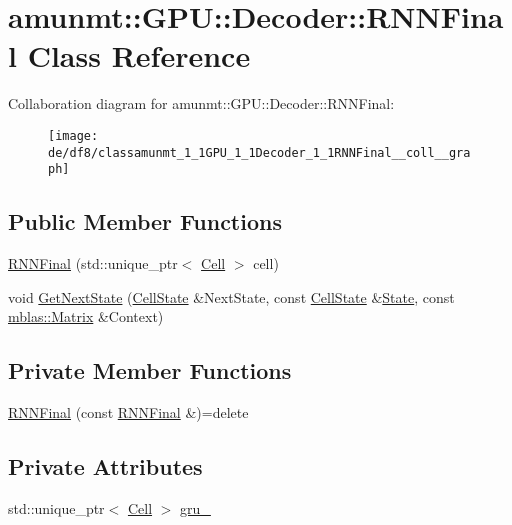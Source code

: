 \hypertarget{classamunmt_1_1GPU_1_1Decoder_1_1RNNFinal}{}\section{amunmt\+:\+:G\+PU\+:\+:Decoder\+:\+:R\+N\+N\+Final Class Reference}
\label{classamunmt_1_1GPU_1_1Decoder_1_1RNNFinal}


Collaboration diagram for amunmt\+:\+:G\+PU\+:\+:Decoder\+:\+:R\+N\+N\+Final\+:
\nopagebreak
\begin{figure}[H]
\begin{center}
\leavevmode
\texttt{[image: de/df8/classamunmt\_1\_1GPU\_1\_1Decoder\_1\_1RNNFinal\_\_coll\_\_graph]}
\end{center}
\end{figure}
\subsection*{Public Member Functions}
\begin{DoxyCompactItemize}
\item 
\hyperlink{classamunmt_1_1GPU_1_1Decoder_1_1RNNFinal_a1d99985b912cc2eee9d837d2bac30799}{R\+N\+N\+Final} (std\+::unique\+\_\+ptr$<$ \hyperlink{classamunmt_1_1GPU_1_1Cell}{Cell} $>$ cell)
\item 
void \hyperlink{classamunmt_1_1GPU_1_1Decoder_1_1RNNFinal_a1b0db5fb40335eeb2acdd098220cbb32}{Get\+Next\+State} (\hyperlink{structamunmt_1_1GPU_1_1CellState}{Cell\+State} \&Next\+State, const \hyperlink{structamunmt_1_1GPU_1_1CellState}{Cell\+State} \&\hyperlink{classamunmt_1_1State}{State}, const \hyperlink{namespaceamunmt_1_1GPU_1_1mblas_ab67821a8254de53e45a623cf73c0aef6}{mblas\+::\+Matrix} \&Context)
\end{DoxyCompactItemize}
\subsection*{Private Member Functions}
\begin{DoxyCompactItemize}
\item 
\hyperlink{classamunmt_1_1GPU_1_1Decoder_1_1RNNFinal_ae7163a490feab5420d5e0f3e64e50d49}{R\+N\+N\+Final} (const \hyperlink{classamunmt_1_1GPU_1_1Decoder_1_1RNNFinal}{R\+N\+N\+Final} \&)=delete
\end{DoxyCompactItemize}
\subsection*{Private Attributes}
\begin{DoxyCompactItemize}
\item 
std\+::unique\+\_\+ptr$<$ \hyperlink{classamunmt_1_1GPU_1_1Cell}{Cell} $>$ \hyperlink{classamunmt_1_1GPU_1_1Decoder_1_1RNNFinal_ac68edc629676f353c6c206b6ebc5b15d}{gru\+\_\+}
\end{DoxyCompactItemize}


